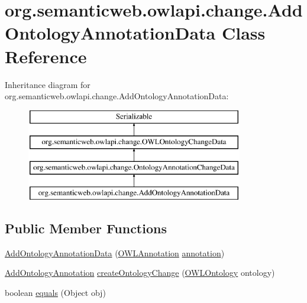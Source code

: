 \hypertarget{classorg_1_1semanticweb_1_1owlapi_1_1change_1_1_add_ontology_annotation_data}{\section{org.\-semanticweb.\-owlapi.\-change.\-Add\-Ontology\-Annotation\-Data Class Reference}
\label{classorg_1_1semanticweb_1_1owlapi_1_1change_1_1_add_ontology_annotation_data}
}
Inheritance diagram for org.\-semanticweb.\-owlapi.\-change.\-Add\-Ontology\-Annotation\-Data\-:\begin{figure}[H]
\begin{center}
\leavevmode
\includegraphics[height=4.000000cm]{classorg_1_1semanticweb_1_1owlapi_1_1change_1_1_add_ontology_annotation_data}
\end{center}
\end{figure}
\subsection*{Public Member Functions}
\begin{DoxyCompactItemize}
\item 
\hyperlink{classorg_1_1semanticweb_1_1owlapi_1_1change_1_1_add_ontology_annotation_data_afddb4866b3eaa21a653d81ffd1b38f17}{Add\-Ontology\-Annotation\-Data} (\hyperlink{interfaceorg_1_1semanticweb_1_1owlapi_1_1model_1_1_o_w_l_annotation}{O\-W\-L\-Annotation} \hyperlink{classorg_1_1semanticweb_1_1owlapi_1_1change_1_1_ontology_annotation_change_data_a9adc959d9ad5bcdce1eee5141c22e3af}{annotation})
\item 
\hyperlink{classorg_1_1semanticweb_1_1owlapi_1_1model_1_1_add_ontology_annotation}{Add\-Ontology\-Annotation} \hyperlink{classorg_1_1semanticweb_1_1owlapi_1_1change_1_1_add_ontology_annotation_data_a4da49bb1ba2e4a76eb56c08af88ada17}{create\-Ontology\-Change} (\hyperlink{interfaceorg_1_1semanticweb_1_1owlapi_1_1model_1_1_o_w_l_ontology}{O\-W\-L\-Ontology} ontology)
\item 
boolean \hyperlink{classorg_1_1semanticweb_1_1owlapi_1_1change_1_1_add_ontology_annotation_data_a6bc7645b8514cf979a000ba79e670294}{equals} (Object obj)
\end{DoxyCompactItemize}
